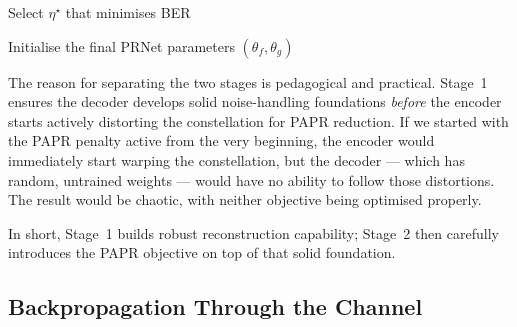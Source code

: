 \begin{algorithm}[H]
    \DontPrintSemicolon
    \SetAlgoLined
    \BlankLine
    Select $\eta^\star$ that minimises BER\;

    \BlankLine
    Initialise the final PRNet parameters $(\theta_f,\theta_g)$\;
    \caption{Two-stage PRNet training procedure~\cite{kim2017novel}.}
    \label{alg:prnet_training}
\end{algorithm}

The reason for separating the two stages is pedagogical and practical. Stage~1 ensures the decoder develops solid noise-handling foundations \emph{before} the encoder starts actively distorting the constellation for PAPR reduction.  If we started with the PAPR penalty active from the very beginning, the encoder would immediately start warping the constellation, but the decoder --- which has random, untrained weights --- would have no ability to follow those distortions.  The result would be chaotic, with neither objective being optimised properly.

In short, Stage~1 builds robust reconstruction capability; Stage~2 then carefully introduces the PAPR objective on top of that solid foundation.


\subsection{Backpropagation Through the Channel}

